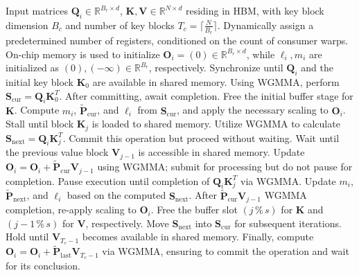 \begin{enumerate}
\begin{algorithm}[H]
    \caption{\small\label{alg:flash3_wgmma}\textsc{FlashAttention-3} Consumer Warpgroup Forward Computation}
    \begin{algorithmic}[1]
      \REQUIRE  Input matrices $\mathbf{Q}_i \in \mathbb{R}^{B_r \times d}$, $\mathbf{K}, \mathbf{V} \in \mathbb{R}^{N \times d}$ residing in HBM, with key block dimension $B_c$ and number of key blocks $T_c = \lceil \frac{N}{B_c} \rceil$.
      \STATE Dynamically assign a predetermined number of registers, conditioned on the count of consumer warps.
      \STATE On-chip memory is used to initialize $\mathbf{O}_i = (0) \in \mathbb{R}^{B_r \times d}$, while $\ell_i, m_i$ are initialized as $(0), (-\infty) \in \mathbb{R}^{B_r}$, respectively.
      \STATE Synchronize until $\mathbf{Q}_i$ and the initial key block $\mathbf{K}_0$ are available in shared memory.
      \STATE Using WGMMA, perform $\mathbf{S}_{\mathrm{cur}} = \mathbf{Q}_i \mathbf{K}_0^T$. After committing, await completion.
      \STATE Free the initial buffer stage for $\mathbf{K}$.
      \STATE Compute $m_{i}$, $\tilde{\mathbf{P}}_{\mathrm{cur}}$, and $\ell_{i}$ from $\mathbf{S}_{\mathrm{cur}}$, and apply the necessary scaling to $\mathbf{O}_i$.
        \STATE Stall until block $\mathbf{K}_j$ is loaded to shared memory.
        \label{code:mainloop_start}
        \STATE Utilize WGMMA to calculate $\mathbf{S}_{\mathrm{next}} = \mathbf{Q}_i \mathbf{K}_{j}^T$. Commit this operation but proceed without waiting. \label{code:first_wgmma}
        \STATE Wait until the previous value block $\mathbf{V}_{j-1}$ is accessible in shared memory.
        \STATE Update $\mathbf{O}_{i} = \mathbf{O}_{i} + \tilde{\mathbf{P}}_{\mathrm{cur}} \mathbf{V}_{j-1}$ using WGMMA; submit for processing but do not pause for completion. \label{code:second_wgmma}
        \STATE Pause execution until completion of $\mathbf{Q}_i \mathbf{K}_{j}^T$ via WGMMA.
        \STATE Update $m_{i}$, $\tilde{\mathbf{P}}_{\mathrm{next}}$, and $\ell_{i}$ based on the computed $\mathbf{S}_{\mathrm{next}}$. \label{code:softmax}
        \STATE After $\tilde{\mathbf{P}}_{\mathrm{cur}} \mathbf{V}_{j-1}$ WGMMA completion, re-apply scaling to $\mathbf{O}_i$.
        \STATE Free the buffer slot $(j\,\%\,s)$ for $\mathbf{K}$ and $(j-1\,\%\,s)$ for $\mathbf{V}$, respectively.
        \STATE Move $\mathbf{S}_{\mathrm{next}}$ into $\mathbf{S}_{\mathrm{cur}}$ for subsequent iterations.
        \label{code:mainloop_end}
      \ENDFOR \STATE Hold until $\mathbf{V}_{T_c - 1}$ becomes available in shared memory.
      \STATE Finally, compute
      $\mathbf{O}_{i} = \mathbf{O}_{i} + \tilde{\mathbf{P}}_{\mathrm{last}} \mathbf{V}_{T_c - 1}$ via WGMMA, ensuring to commit the operation and wait for its conclusion.


\end{algorithmic}
\end{algorithm}
\end{enumerate}
